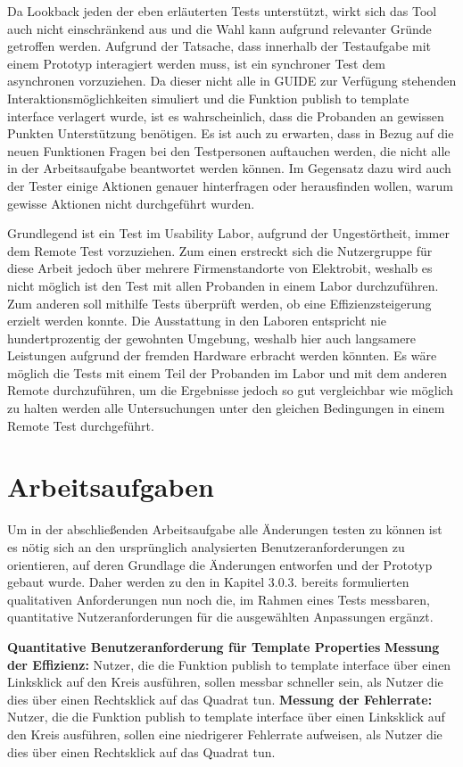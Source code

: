 Da Lookback jeden der eben erläuterten Tests unterstützt, wirkt sich das Tool auch nicht einschränkend aus und die Wahl kann aufgrund relevanter Gründe getroffen werden.
Aufgrund der Tatsache, dass innerhalb der Testaufgabe mit einem Prototyp interagiert werden muss, ist ein synchroner Test dem asynchronen vorzuziehen.
Da dieser nicht alle in GUIDE zur Verfügung stehenden Interaktionsmöglichkeiten simuliert und die Funktion \glqq publish to template interface\grqq{} verlagert wurde, ist es wahrscheinlich, dass die Probanden an gewissen Punkten Unterstützung benötigen.
Es ist auch zu erwarten, dass in Bezug auf die neuen Funktionen Fragen bei den Testpersonen auftauchen werden, die nicht alle in der Arbeitsaufgabe beantwortet werden können.
Im Gegensatz dazu wird auch der Tester einige Aktionen genauer hinterfragen oder herausfinden wollen, warum gewisse Aktionen nicht durchgeführt wurden.

Grundlegend ist ein Test im Usability Labor, aufgrund der Ungestörtheit, immer dem Remote Test vorzuziehen.
Zum einen erstreckt sich die Nutzergruppe für diese Arbeit jedoch über mehrere Firmenstandorte von Elektrobit, weshalb es nicht möglich ist den Test mit allen Probanden in einem Labor durchzuführen.
Zum anderen soll mithilfe Tests überprüft werden, ob eine Effizienzsteigerung erzielt werden konnte.
Die Ausstattung in den Laboren entspricht nie hundertprozentig der gewohnten Umgebung, weshalb hier auch langsamere Leistungen aufgrund der fremden Hardware erbracht werden könnten.
Es wäre möglich die Tests mit einem Teil der Probanden im Labor und mit dem anderen Remote durchzuführen, um die Ergebnisse jedoch so gut vergleichbar wie möglich zu halten werden alle Untersuchungen unter den gleichen Bedingungen in einem Remote Test durchgeführt.

\section{Arbeitsaufgaben}
Um in der abschließenden Arbeitsaufgabe alle Änderungen testen zu können ist es nötig sich an den ursprünglich analysierten Benutzeranforderungen zu orientieren, auf deren Grundlage die Änderungen entworfen und der Prototyp gebaut wurde.
Daher werden zu den in Kapitel 3.0.3. bereits formulierten qualitativen Anforderungen nun noch die, im Rahmen eines Tests messbaren, quantitative Nutzeranforderungen für die ausgewählten Anpassungen ergänzt.

\textbf{Quantitative Benutzeranforderung für Template Properties}\newline
\textbf{Messung der Effizienz:}
Nutzer, die die Funktion \glqq publish to template interface\grqq{} über einen Linksklick auf den Kreis ausführen, sollen messbar schneller sein, als Nutzer die dies über einen Rechtsklick auf das Quadrat tun. \newline
\textbf{Messung der Fehlerrate:} 
Nutzer, die die Funktion \glqq publish to template interface\grqq{} über einen Linksklick auf den Kreis ausführen, sollen eine niedrigerer Fehlerrate aufweisen, als Nutzer die dies über einen Rechtsklick auf das Quadrat tun.


